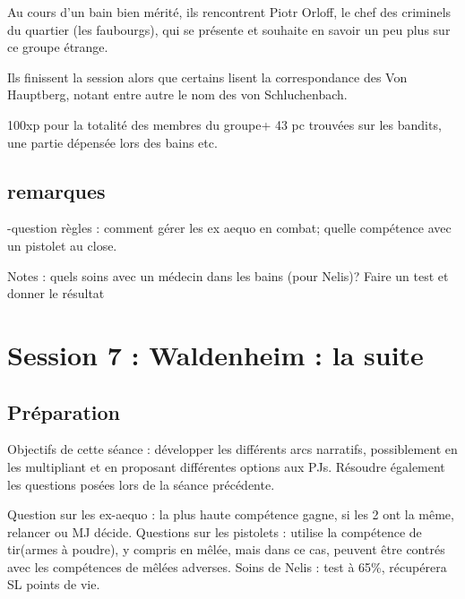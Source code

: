 \documentclass[10pt,a4paper]{book}
\begin{document}
Au cours d'un bain bien mérité, ils rencontrent Piotr Orloff, le chef des criminels du quartier (les faubourgs), qui se présente et souhaite en savoir un peu plus sur ce groupe étrange.

Ils finissent la session alors que certains lisent la correspondance des Von Hauptberg, notant entre autre le nom des von Schluchenbach.

100xp pour la totalité des membres du groupe+ 43 pc trouvées sur les bandits, une partie dépensée lors des bains etc.
\subsection{remarques}
-question règles : comment gérer les ex aequo en combat; quelle compétence avec un pistolet au close.

Notes : quels soins avec un médecin dans les bains (pour Nelis)? Faire un test et donner le résultat

\section{Session 7 : Waldenheim : la suite}
\subsection{Préparation}
Objectifs de cette séance : développer les différents arcs narratifs, possiblement en les multipliant et en proposant différentes options aux PJs.
Résoudre également les questions posées lors de la séance précédente.

Question sur les ex-aequo : la plus haute compétence gagne, si les 2 ont la même, relancer ou MJ décide. Questions sur les pistolets : utilise la compétence de tir(armes à poudre), y compris en mêlée,  mais dans ce cas, peuvent être contrés avec les compétences de mêlées adverses. Soins de Nelis : test à 65\%, récupérera SL points de vie.
\end{document}
